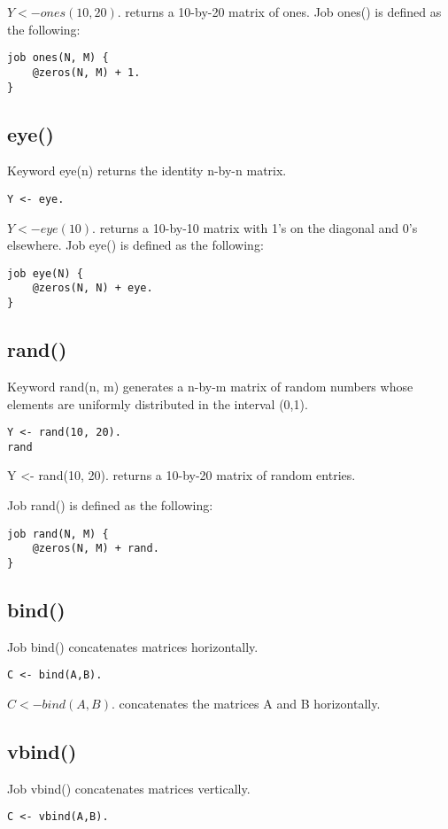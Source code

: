 \documentclass[prodmode,acmtecs]{acmsmall}
\begin{document}
$Y <- ones(10, 20).$ returns a 10-by-20 matrix of ones.
Job ones() is defined as the following:
\begin{lstlisting}
job ones(N, M) {
    @zeros(N, M) + 1.
}
\end{lstlisting}
\medskip

\subsection{eye()}
Keyword eye(n) returns the identity n-by-n matrix.
\begin{lstlisting}
Y <- eye.
\end{lstlisting}

$Y <- eye(10).$ returns a 10-by-10 matrix with 1's on the diagonal and 0's elsewhere.
Job eye() is defined as the following:
\begin{lstlisting}
job eye(N) {
    @zeros(N, N) + eye.
} 
\end{lstlisting}
\medskip

\subsection{rand()}
Keyword rand(n, m) generates a n-by-m matrix of random numbers whose elements are
uniformly distributed in the interval (0,1).
\begin{lstlisting}
Y <- rand(10, 20).
rand
\end{lstlisting}

Y <- rand(10, 20). returns a 10-by-20 matrix of random entries.

Job rand() is defined as the following:
\begin{lstlisting}
job rand(N, M) {
    @zeros(N, M) + rand.
} 
\end{lstlisting}
\medskip

\subsection{bind()}
Job bind() concatenates matrices horizontally.
\begin{lstlisting}
C <- bind(A,B).
\end{lstlisting}

$C <- bind(A,B).$ concatenates the matrices A and B horizontally.
\medskip

\subsection{vbind()}
Job vbind() concatenates matrices vertically.
\begin{lstlisting}
C <- vbind(A,B).
\end{lstlisting}
\end{document}
